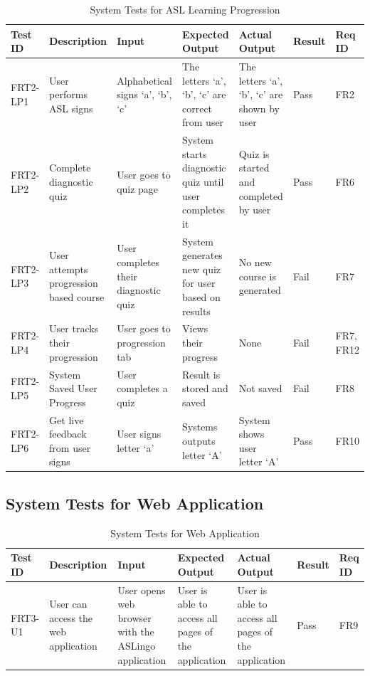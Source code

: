 \documentclass[12pt, titlepage]{article}
\begin{document}
\begin{longtable}{|p{1cm}|p{2.25cm}|p{3cm}|p{3cm}|p{1.75cm}|p{1.25cm}|p{1cm}|}
  \caption{System Tests for ASL Learning Progression} \\
  \hline
  \textbf{Test ID} & \textbf{Description} & \textbf{Input} & \textbf{Expected Output} & \textbf{Actual Output} & \textbf{Result} & \textbf{Req ID}\\
  \hline
  FRT2-LP1 & User performs ASL signs & Alphabetical signs `a', `b', `c' & The letters `a', `b', `c' are correct from user & The letters `a', `b', `c' are shown by user & Pass & FR2 \\
  \hline
  FRT2-LP2 & Complete diagnostic quiz & User goes to quiz page & System starts diagnostic quiz until user completes it & Quiz is started and completed by user & Pass & FR6 \\
  \hline
  FRT2-LP3 & User attempts progression based course & User completes their diagnostic quiz & System generates new quiz for user based on results & No new course is generated & Fail & FR7 \\
  \hline
  FRT2-LP4 & User tracks their progression & User goes to progression tab & Views their progress & None & Fail & FR7, FR12 \\
  \hline
  FRT2-LP5 & System Saved User Progress & User completes a quiz & Result is stored and saved & Not saved & Fail & FR8 \\
  \hline
  FRT2-LP6 & Get live feedback from user signs & User signs letter `a' & Systems outputs letter `A' & System shows user letter `A' & Pass & FR10 \\
  \bottomrule
  \end{longtable}

\subsection{System Tests for Web Application}
\begin{longtable}{|p{1cm}|p{2.5cm}|p{2cm}|p{2cm}|p{2cm}|p{1.5cm}|p{1cm}|}
\caption{System Tests for Web Application} \\
\hline
\textbf{Test ID} & \textbf{Description} & \textbf{Input} & \textbf{Expected Output} & \textbf{Actual Output} & \textbf{Result} & \textbf{Req ID}\\
\hline
FRT3-U1 & User can access the web application & User opens web browser with the ASLingo application & User is able to access all pages of the application & User is able to access all pages of the application & Pass & FR9 \\
\bottomrule
\end{longtable}
\end{document}
